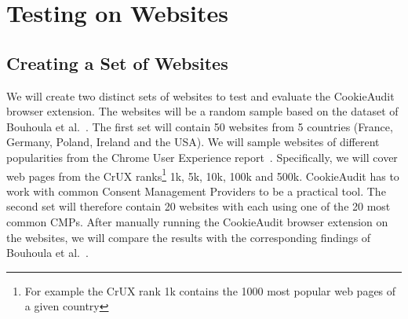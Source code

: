 \chapter{Testing on Websites}

\section{Creating a Set of Websites}

We will create two distinct sets of websites to test and evaluate the CookieAudit browser extension. 
The websites will be a random sample based on the dataset of Bouhoula et al.~\cite{bouhoula2023automated}. 
The first set will contain 50 websites from 5 countries (France, Germany, Poland, Ireland and the USA).
We will sample websites of different popularities from the Chrome User Experience report~\cite{chrome2024crux}.
Specifically, we will cover web pages from the CrUX ranks\footnote{For example the CrUX rank 1k contains the 1000 most popular web pages of a given country} 1k, 5k, 10k, 100k and 500k.
CookieAudit has to work with common Consent Management Providers to be a practical tool.
The second set will therefore contain 20 websites with each using one of the 20 most common CMPs. 
After manually running the CookieAudit browser extension on the websites, we will compare the results with the corresponding findings of Bouhoula et al.~\cite{bouhoula2023automated}.